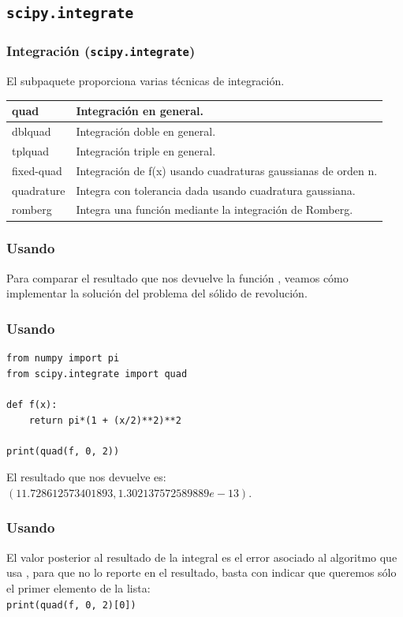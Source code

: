 \subsection{\texttt{scipy.integrate}}
\begin{frame}
\frametitle{Integración (\texttt{scipy.integrate})}
El subpaquete  proporciona varias técnicas de integración.
\fontsize{12}{12}\selectfont
	\begin{tabular}{l | p{8cm}}
	quad 		& Integración en general. \\ \hline
	dblquad 	& Integración doble en general. \\ \hline
	tplquad 	& Integración triple en general. \\ \hline
	fixed-quad 	& Integración de f(x) usando cuadraturas gaussianas de orden n. \\ \hline
	quadrature 	& Integra con tolerancia dada usando cuadratura gaussiana. \\ \hline
	romberg 	& Integra una función mediante la integración de Romberg.
\end{tabular}
\end{frame}
\begin{frame}[fragile]
\frametitle{Usando }
Para comparar el resultado que nos devuelve la función , veamos cómo implementar la solución del problema del sólido de revolución.
\end{frame}
\begin{frame}[fragile]
\frametitle{Usando }
\begin{lstlisting}[caption=Integración con scipy, style=FormattedNumber, basicstyle=\linespread{1.1}\ttfamily=\small, columns=fullflexible]
from numpy import pi
from scipy.integrate import quad

def f(x):
    return pi*(1 + (x/2)**2)**2
   
print(quad(f, 0, 2))
\end{lstlisting}
\pause
El resultado que nos devuelve es: $(11.728612573401893, 1.302137572589889e-13)$.
\end{frame}
\begin{frame}[fragile]
\frametitle{Usando }
El valor posterior al resultado de la integral es el error asociado al algoritmo que usa , para que no lo reporte en el resultado, basta con indicar que queremos sólo el primer elemento de la lista:
\\
\bigskip
\verb|print(quad(f, 0, 2)[0])|
\end{frame}
